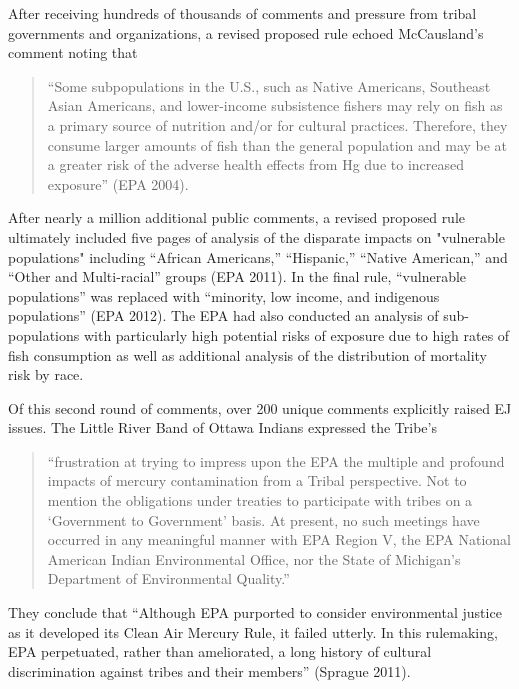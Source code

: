 \documentclass[
      12pt,
        ]{article}
\begin{document}
After receiving hundreds of thousands of comments and pressure from
tribal governments and organizations, a revised proposed rule echoed McCausland's
comment noting that

\begin{quote}
``Some subpopulations in the U.S., such as Native
Americans, Southeast Asian Americans, and lower-income subsistence
fishers may rely on fish as a primary source of nutrition and/or for
cultural practices. Therefore, they consume larger amounts of fish than
the general population and may be at a greater risk of the adverse
health effects from Hg due to increased exposure'' (EPA 2004).
\end{quote}

After nearly a million additional public comments, a revised proposed
rule ultimately included five pages of analysis of the disparate impacts
on "vulnerable populations" including ``African Americans,'' ``Hispanic,''
``Native American,'' and ``Other and Multi-racial'' groups (EPA 2011). In the final rule, ``vulnerable populations'' was replaced
with ``minority, low income, and indigenous populations'' (EPA 2012). The EPA
had also conducted an analysis of sub-populations with particularly high
potential risks of exposure due to high rates of fish consumption as well
as additional analysis of the distribution of mortality risk by
race.

Of this second round of comments, over 200 unique comments explicitly raised
EJ issues. The Little River Band of Ottawa Indians
expressed the Tribe's

\begin{quote}
``frustration at trying to impress upon the EPA the
multiple and profound impacts of mercury contamination from a Tribal
perspective. Not to mention the obligations under treaties to
participate with tribes on a `Government to Government' basis. At
present, no such meetings have occurred in any meaningful manner with
EPA Region V, the EPA National American Indian Environmental Office, nor
the State of Michigan's Department of Environmental Quality.''
\end{quote}

They
conclude that ``Although EPA purported to consider environmental justice
as it developed its Clean Air Mercury Rule, it failed utterly. In this
rulemaking, EPA perpetuated, rather than ameliorated, a long history of
cultural discrimination against tribes and their members'' (Sprague
2011).
\end{document}
